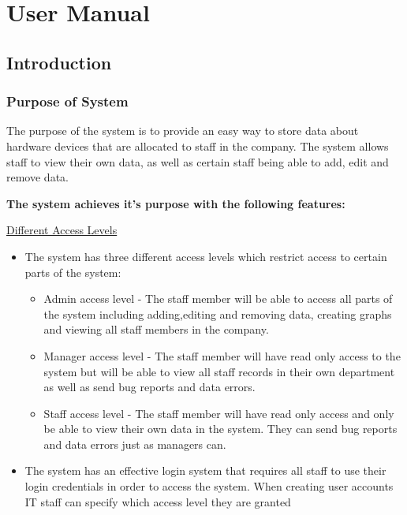 
\chapter{User Manual}

\startcontents[chapters]

\section{Introduction}

\subsection{Purpose of System}

The purpose of the system is to provide an easy way to store data about hardware devices that are allocated to staff in the company. The system allows staff to view their own data, as well as certain staff being able to add, edit and remove data.

\textbf{The system achieves it's purpose with the following features:}

\underline{Different Access Levels}


\begin{itemize}
\item{The system has three different access levels which restrict access to certain parts of the system:}
	\begin{itemize}
	\item{Admin access level - The staff member will be able to access all parts of the system including adding,editing and removing data, creating graphs and viewing all staff members in the company.}
	\item{Manager access level - The staff member will have read only access to the system but will be able to view all staff records in their own department as well as send bug reports and data errors.}
	\item{Staff access level - The staff member will have read only access and only be able to view their own data in the system. They can send bug reports and data errors just as managers can.}
	\end{itemize}
\item{The system has an effective login system that requires all staff to use their login credentials in order to access the system. When creating user accounts IT staff can specify which access level they are granted}
\end{itemize}

